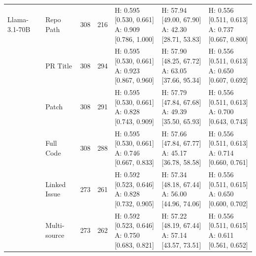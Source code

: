 \begin{table}[tp]
\begin{tabular}{llrrlll}
\midrule
Llama-3.1-70B & Repo Path & 308 & 216 & \shortstack[l]{H: 0.595 [0.530, 0.661]\\A: 0.909 [0.786, 1.000]} & \shortstack[l]{H: 57.94 [49.00, 67.90]\\A: 42.30 [28.71, 53.83]} & \shortstack[l]{H: 0.556 [0.511, 0.613]\\A: 0.737 [0.667, 0.800]} \\
 & PR Title & 308 & 294 & \shortstack[l]{H: 0.595 [0.530, 0.661]\\A: 0.923 [0.867, 0.960]} & \shortstack[l]{H: 57.90 [48.25, 67.72]\\A: 63.05 [37.66, 95.34]} & \shortstack[l]{H: 0.556 [0.511, 0.613]\\A: 0.650 [0.607, 0.692]} \\
 & Patch & 308 & 291 & \shortstack[l]{H: 0.595 [0.530, 0.661]\\A: 0.828 [0.743, 0.909]} & \shortstack[l]{H: 57.79 [47.84, 67.68]\\A: 49.39 [35.50, 65.93]} & \shortstack[l]{H: 0.556 [0.511, 0.613]\\A: 0.700 [0.643, 0.743]} \\
 & Full Code & 308 & 288 & \shortstack[l]{H: 0.595 [0.530, 0.661]\\A: 0.746 [0.667, 0.833]} & \shortstack[l]{H: 57.66 [47.84, 67.77]\\A: 45.17 [36.78, 58.58]} & \shortstack[l]{H: 0.556 [0.511, 0.613]\\A: 0.714 [0.660, 0.761]} \\
 & Linked Issue & 273 & 261 & \shortstack[l]{H: 0.592 [0.523, 0.646]\\A: 0.828 [0.732, 0.905]} & \shortstack[l]{H: 57.34 [48.18, 67.44]\\A: 56.00 [44.96, 74.06]} & \shortstack[l]{H: 0.556 [0.511, 0.615]\\A: 0.650 [0.600, 0.702]} \\
 & Multi-source & 273 & 262 & \shortstack[l]{H: 0.592 [0.523, 0.646]\\A: 0.750 [0.683, 0.821]} & \shortstack[l]{H: 57.22 [48.19, 67.44]\\A: 57.14 [43.57, 73.51]} & \shortstack[l]{H: 0.556 [0.511, 0.615]\\A: 0.611 [0.561, 0.652]} \\
\bottomrule
\end{tabular}
\end{table}
